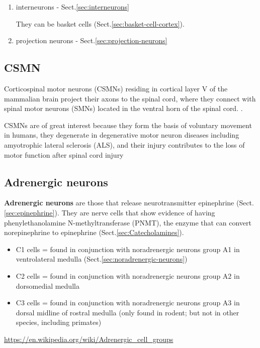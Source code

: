 \begin{enumerate}
  \item interneurons - Sect.\ref{sec:interneurons}
  
They can be basket cells (Sect.\ref{sec:basket-cell-cortex}).  
  
  \item projection neurons - Sect.\ref{sec:projection-neurons}
\end{enumerate}

\subsection{CSMN}
\label{sec:CSMN}

Corticospinal motor neurons (CSMNs) residing in cortical layer V of the
mammalian brain project their axons to the spinal cord, where they connect with
spinal motor neurons (SMNs) located in the ventral horn of the spinal cord.
\citep{mandemakers2014}.

CSMNs are of great interest because they form the basis of voluntary movement in
humans, they degenerate in degenerative motor neuron diseases including
amyotrophic lateral sclerosis (ALS), and their injury contributes to the loss of
motor function after spinal cord injury

\subsection{Adrenergic neurons}
\label{sec:adrenergic_neuron}

{\bf Adrenergic neurons} are those that release neurotransmitter epinephrine
(Sect.\ref{sec:epinephrine}).
They are nerve cells that show evidence of having phenylethanolamine
N-methyltransferase (PNMT), the enzyme that can convert norepinephrine to
epinephrine (Sect.\ref{sec:Catecholamines}).

\begin{itemize}
  \item C1 cells = found in conjunction with noradrenergic neurons group A1 in
  ventrolateral medulla (Sect.\ref{sec:noradrenergic-neurons})
  
  
  \item C2 cells = found in conjunction with noradrenergic neurons group A2 in
  dorsomedial medulla 
  
  \item C3 cells = found in conjunction with noradrenergic neurons group A3 in
  dorsal midline of rostral medulla (only found in rodent; but not in other
  species, including primates)
    
\end{itemize}
\url{https://en.wikipedia.org/wiki/Adrenergic_cell_groups}




